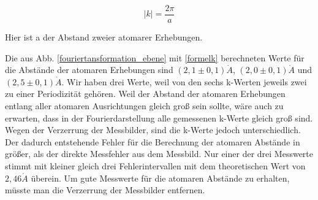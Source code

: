 \documentclass[10pt,a4paper]{article}
\begin{document}
\begin{equation}
	|k| = \frac{2\pi}{a}
	\label{formelk}
\end{equation}

Hier ist a der Abstand zweier atomarer Erhebungen.

Die aus Abb. \ref{fouriertansformation_ebene} mit \eqref{formelk} berechneten Werte für die Abstände der atomaren Erhebungen sind $(2,1\pm0,1)\mathring{A}$, $(2,0\pm0,1)\mathring{A}$ und $(2,5\pm0,1)\mathring{A}$. Wir haben drei Werte, weil von den sechs k-Werten jeweils zwei zu einer Periodizität gehören. Weil der Abstand der atomaren Erhebungen entlang aller atomaren Ausrichtungen gleich groß sein sollte, wäre auch zu erwarten, dass in der Fourierdarstellung alle gemessenen k-Werte gleich groß sind. Wegen der Verzerrung der Messbilder, sind die k-Werte jedoch unterschiedlich. Der dadurch entstehende Fehler für die Berechnung der atomaren Abstände in größer, als der direkte Messfehler aus dem Messbild. 
Nur einer der drei Messwerte stimmt mit kleiner gleich drei Fehlerintervallen mit dem theoretischen Wert von $2,46\mathring{A}$ überein.
Um gute Messwerte für die atomaren Abstände zu erhalten, müsste man die Verzerrung der Messbilder entfernen.

\end{document}
